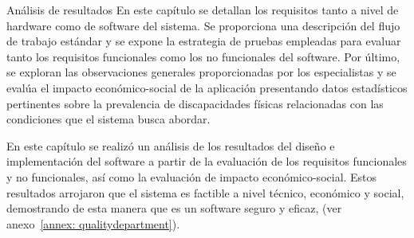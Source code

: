 \begin{thesischapter}{3} {Análisis de resultados}
En este capítulo se detallan los requisitos tanto a nivel de hardware como de software del sistema. Se proporciona una descripción del flujo de trabajo estándar y se expone la estrategia de pruebas empleadas para evaluar tanto los requisitos funcionales como los no funcionales del software. Por último, se exploran las observaciones generales proporcionadas por los especialistas y se evalúa el impacto económico-social de la aplicación presentando datos estadísticos pertinentes sobre la prevalencia de discapacidades físicas relacionadas con las condiciones que el sistema busca abordar.









En este capítulo se realizó un análisis de los resultados del diseño e implementación del software a partir de la  evaluación de los requisitos funcionales y no funcionales, así como la evaluación  de impacto económico-social. Estos resultados arrojaron que el sistema es factible a nivel técnico, económico y social, demostrando de esta manera que es un software seguro y eficaz, (ver anexo~\ref{annex: qualitydepartment}).
\end{thesischapter}